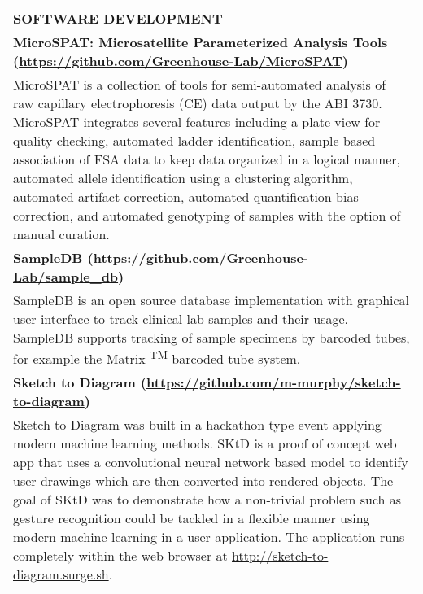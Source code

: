 \begin{center}
    \begin{tabularx}{\textwidth}{X}
        {\large \textbf{SOFTWARE DEVELOPMENT}} \\
        \small \textbf{MicroSPAT: Microsatellite Parameterized Analysis Tools (\href{https://github.com/Greenhouse-Lab/MicroSPAT}{https://github.com/Greenhouse-Lab/MicroSPAT})} \\
        \small MicroSPAT is a collection of tools for semi-automated analysis of raw capillary electrophoresis (CE) data output by the ABI 3730. MicroSPAT integrates several features including a plate view for quality checking, automated ladder identification, sample based association of FSA data to keep data organized in a logical manner, automated allele identification using a clustering algorithm, automated artifact correction, automated quantification bias correction, and automated genotyping of samples with the option of manual curation. \\
        \small \textbf{SampleDB (\href{https://github.com/Greenhouse-Lab/sample_db}{https://github.com/Greenhouse-Lab/sample\_db})} \\
        \small SampleDB is an open source database implementation with graphical user interface to track clinical lab samples and their usage. SampleDB supports tracking of sample specimens by barcoded tubes, for example the Matrix \textsuperscript{TM} barcoded tube system. \\
        \small \textbf{Sketch to Diagram (\href{https://github.com/m-murphy/sketch-to-diagram}{https://github.com/m-murphy/sketch-to-diagram})} \\
        \small Sketch to Diagram was built in a hackathon type event applying modern machine learning methods. SKtD is a proof of concept web app that uses a convolutional neural network based model to identify user drawings which are then converted into rendered objects. The goal of SKtD was to demonstrate how a non-trivial problem such as gesture recognition could be tackled in a flexible manner using modern machine learning in a user application. The application runs completely within the web browser at \href{http://sketch-to-diagram.surge.sh}{http://sketch-to-diagram.surge.sh}. \\
    \end{tabularx}
\end{center}